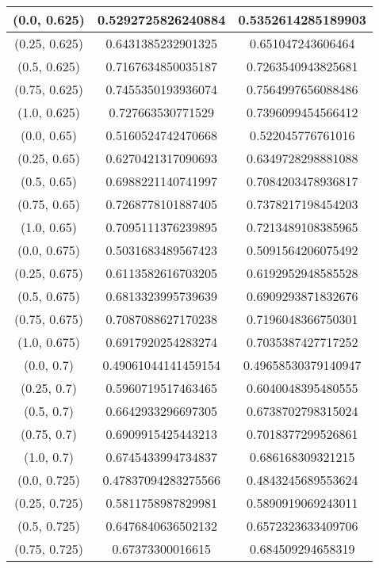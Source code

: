\begin{table}[H]
\begin{tabular}{|c|c|c|}
\hline
(0.0, 0.625) & 0.5292725826240884 & 0.5352614285189903 \\
\hline
(0.25, 0.625) & 0.6431385232901325 & 0.651047243606464 \\
\hline
(0.5, 0.625) & 0.7167634850035187 & 0.7263540943825681 \\
\hline
(0.75, 0.625) & 0.7455350193936074 & 0.7564997656088486 \\
\hline
(1.0, 0.625) & 0.727663530771529 & 0.7396099454566412 \\
\hline
\hline
(0.0, 0.65) & 0.5160524742470668 & 0.522045776761016 \\
\hline
(0.25, 0.65) & 0.6270421317090693 & 0.6349728298881088 \\
\hline
(0.5, 0.65) & 0.6988221140741997 & 0.7084203478936817 \\
\hline
(0.75, 0.65) & 0.7268778101887405 & 0.7378217198454203 \\
\hline
(1.0, 0.65) & 0.7095111376239895 & 0.7213489108385965 \\
\hline
\hline
(0.0, 0.675) & 0.5031683489567423 & 0.5091564206075492 \\
\hline
(0.25, 0.675) & 0.6113582616703205 & 0.6192952948585528 \\
\hline
(0.5, 0.675) & 0.6813323995739639 & 0.6909293871832676 \\
\hline
(0.75, 0.675) & 0.7087088627170238 & 0.7196048366750301 \\
\hline
(1.0, 0.675) & 0.6917920254283274 & 0.7035387427717252 \\
\hline
\hline
(0.0, 0.7) & 0.49061044141459154 & 0.49658530379140947 \\
\hline
(0.25, 0.7) & 0.5960719517463465 & 0.6040048395480555 \\
\hline
(0.5, 0.7) & 0.6642933296697305 & 0.6738702798315024 \\
\hline
(0.75, 0.7) & 0.6909915425443213 & 0.7018377299526861 \\
\hline
(1.0, 0.7) & 0.6745433994734837 & 0.686168309321215 \\
\hline
\hline
(0.0, 0.725) & 0.47837094283275566 & 0.4843245689553624 \\
\hline
(0.25, 0.725) & 0.5811758987829981 & 0.5890919069243011 \\
\hline
(0.5, 0.725) & 0.6476840636502132 & 0.6572323633409706 \\
\hline
(0.75, 0.725) & 0.67373300016615 & 0.684509294658319 \\

\end{tabular}
\end{table}
